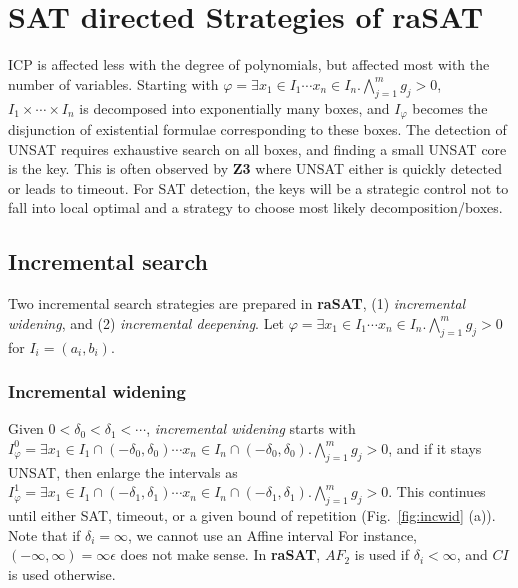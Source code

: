 \documentclass[runningheads,a4paper,oribibl]{llncs}
\begin{document}
\section{SAT directed Strategies of {\bf raSAT}} \label{sec:strategy}

ICP is affected less with the degree of polynomials, but affected most with the number of variables. 
Starting with $\varphi = \exists x_1 \in I_1 \cdots x_n \in I_n. \bigwedge \limits_{j=1}^m g_j > 0$, 
$I_1 \times \cdots \times I_n$ is decomposed into exponentially many boxes, 
and $I_{\varphi}$ becomes the disjunction of existential formulae corresponding to these boxes.
The detection of UNSAT requires exhaustive search on all boxes, and finding a small UNSAT core
is the key. This is often observed by {\bf Z3} where UNSAT either is quickly detected or leads to timeout. 
For SAT detection, the keys will be a strategic control not to fall into local optimal and
a strategy to choose most likely decomposition/boxes. 

\subsection{Incremental search} \label{sec:incsearch}

Two incremental search strategies are prepared in {\bf raSAT}, 
(1) {\em incremental widening}, and (2) {\em incremental deepening}. 
Let
$\varphi = \exists x_1 \in I_1 \cdots x_n \in I_n. \bigwedge \limits_{j=1}^m g_j > 0$
for $I_i = (a_i,b_i)$. %

\subsubsection*{Incremental widening}
Given $0 < \delta_0 < \delta_1 < \cdots$, 
{\em incremental widening} starts with 
$I_{\varphi}^0 =
\exists x_1 \in I_1 \cap (-\delta_0 , \delta_0) \cdots x_n \in I_n \cap (-\delta_0 , \delta_0). 
\bigwedge \limits_{j=1}^m g_j > 0$, 
and if it stays  UNSAT, then enlarge the intervals as 
$I_{\varphi}^1 =
\exists x_1 \in I_1 \cap (-\delta_1 , \delta_1) \cdots x_n \in I_n \cap (-\delta_1 , \delta_1). 
\bigwedge \limits_{j=1}^m g_j > 0$. This continues until either SAT, timeout, or
a given bound of repetition (Fig.~\ref{fig:incwid} (a)). 
%
Note that if $\delta_i = \infty$, we cannot use an Affine interval
For instance, $(-\infty,\infty) = \infty \epsilon$ does not make sense.
In {\bf raSAT}, $AF_2$ is used if $\delta_i < \infty$, and $CI$ is used otherwise.
\end{document}

